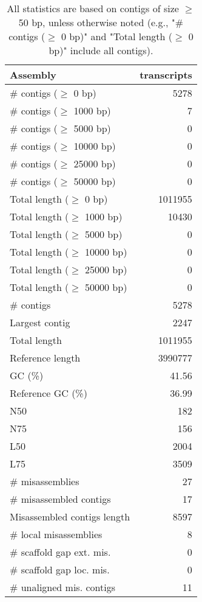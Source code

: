 \documentclass[12pt,a4paper]{article}
\begin{document}
\begin{table}[ht]
\begin{center}
\caption{All statistics are based on contigs of size $\geq$ 50 bp, unless otherwise noted (e.g., "\# contigs ($\geq$ 0 bp)" and "Total length ($\geq$ 0 bp)" include all contigs).}
\begin{tabular}{|l*{1}{|r}|}
\hline
Assembly & transcripts \\ \hline
\# contigs ($\geq$ 0 bp) & 5278 \\ \hline
\# contigs ($\geq$ 1000 bp) & 7 \\ \hline
\# contigs ($\geq$ 5000 bp) & 0 \\ \hline
\# contigs ($\geq$ 10000 bp) & 0 \\ \hline
\# contigs ($\geq$ 25000 bp) & 0 \\ \hline
\# contigs ($\geq$ 50000 bp) & 0 \\ \hline
Total length ($\geq$ 0 bp) & 1011955 \\ \hline
Total length ($\geq$ 1000 bp) & 10430 \\ \hline
Total length ($\geq$ 5000 bp) & 0 \\ \hline
Total length ($\geq$ 10000 bp) & 0 \\ \hline
Total length ($\geq$ 25000 bp) & 0 \\ \hline
Total length ($\geq$ 50000 bp) & 0 \\ \hline
\# contigs & 5278 \\ \hline
Largest contig & 2247 \\ \hline
Total length & 1011955 \\ \hline
Reference length & 3990777 \\ \hline
GC (\%) & 41.56 \\ \hline
Reference GC (\%) & 36.99 \\ \hline
N50 & 182 \\ \hline
N75 & 156 \\ \hline
L50 & 2004 \\ \hline
L75 & 3509 \\ \hline
\# misassemblies & 27 \\ \hline
\# misassembled contigs & 17 \\ \hline
Misassembled contigs length & 8597 \\ \hline
\# local misassemblies & 8 \\ \hline
\# scaffold gap ext. mis. & 0 \\ \hline
\# scaffold gap loc. mis. & 0 \\ \hline
\# unaligned mis. contigs & 11 \\ \hline

\end{tabular}
\end{center}
\end{table}
\end{document}
